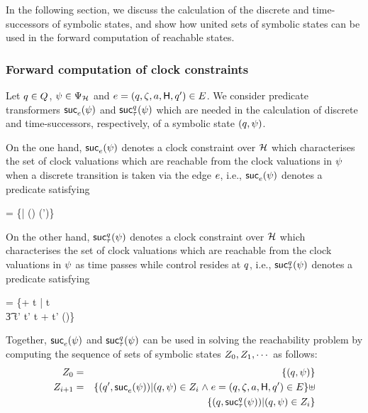 {In the following section, we discuss the calculation of the discrete
and time-successors of symbolic states, and show how united sets of
symbolic states can be used in the forward computation of reachable
states.

\subsubsection{Forward computation of clock constraints}
Let $q \in Q$, $\clkcond \in \ClockConstraints$ and
$e = (q,{\zeta},a,{\sf H},q') \in E$.
We consider predicate transformers $\mathop{{\sf suc}_{e}^{}}({\psi})$ and
$\mathop{{\sf suc}_{\tau}^{q}}({\psi})$ which are needed in the calculation of discrete
and time-successors, respectively, of a symbolic state
$(q,{\psi})$. 

On the one hand, $\mathop{{\sf suc}_{e}^{}}({\psi})$ denotes a clock constraint
over $\tgclks$ which characterises the set of clock valuations which
are reachable from the clock valuations in ${\psi}$ when a discrete
transition is taken via the edge $e$, i.e.,
$\mathop{{\sf suc}_{e}^{}}({\psi})$ denotes a predicate satisfying
\begin{zed}
 \chset{\suc{\tgedge}{}(\clkcond)} =
  \{\clkvl[\someclks:=0] | \clkvl \in \clkvls 
  \land (\clkvl \models \clkcond \land \tgguard)
  \land \clkvl[\someclks:=0] \models \tginv(\tgloc')\} 
\end{zed}

On the other hand, $\mathop{{\sf suc}_{\tau}^{q}}({\psi})$ denotes a clock constraint
over $\tgclks$ which characterises the set of clock valuations which are
reachable from the clock valuations in ${\psi}$ as time passes while
control resides at $q$, i.e., $\mathop{{\sf suc}_{\tau}^{q}}({\psi})$ denotes
a predicate satisfying
\begin{zed}
  \chset{\suc{\tau}{\tgloc}(\clkcond)} =
  \{\clkvl + t | \clkvl \in \clkvls \land t \in \Time \land \clkvl \models \clkcond \land \\
\t3 \forall t' \in \Time \such t' \leq t
    \implies \clkvl + t' \models \tginv(\tgloc)\}  
\end{zed}   

Together, $\mathop{{\sf suc}_{e}^{}}({\psi})$ and $\mathop{{\sf suc}_{\tau}^{q}}({\psi})$
can be used in solving the reachability problem by computing
the sequence of sets of symbolic states $Z_0, Z_1, \cdots$ as
follows:
\begin{eqnarray*}
Z_0 & = & \{(q,{\psi})\} \\ 
Z_{i+1} & = & \{(q',\mathop{{\sf suc}_{e}^{}}({\psi})) |
                  (q,{\psi}) \in Z_i \mathrel{\wedge} 
                  e = (q,{\zeta},a,{\sf H},q') \in 
                  E\} \uplus \\
         &   & \{(q,\mathop{{\sf suc}_{\tau}^{q}}({\psi})) | (q,{\psi}) \in
                  Z_i\}  
\end{eqnarray*} 

}
